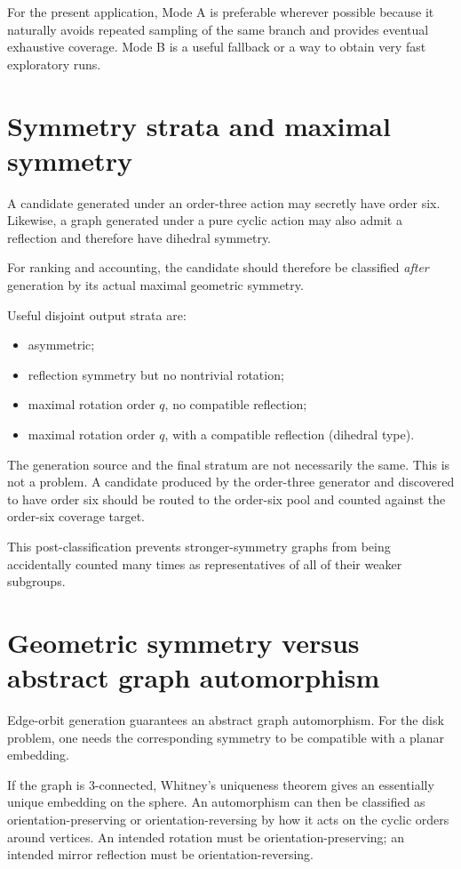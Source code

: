 \documentclass[11pt]{article}
\begin{document}
For the present application, Mode A is preferable wherever possible because it naturally avoids repeated sampling of the same branch and provides eventual exhaustive coverage. Mode B is a useful fallback or a way to obtain very fast exploratory runs.

\section{Symmetry strata and maximal symmetry}

A candidate generated under an order-three action may secretly have order six. Likewise, a graph generated under a pure cyclic action may also admit a reflection and therefore have dihedral symmetry.

For ranking and accounting, the candidate should therefore be classified \emph{after} generation by its actual maximal geometric symmetry.

Useful disjoint output strata are:
\begin{itemize}
  \item asymmetric;
  \item reflection symmetry but no nontrivial rotation;
  \item maximal rotation order \(q\), no compatible reflection;
  \item maximal rotation order \(q\), with a compatible reflection (dihedral type).
\end{itemize}

The generation source and the final stratum are not necessarily the same. This is not a problem. A candidate produced by the order-three generator and discovered to have order six should be routed to the order-six pool and counted against the order-six coverage target.

This post-classification prevents stronger-symmetry graphs from being accidentally counted many times as representatives of all of their weaker subgroups.

\section{Geometric symmetry versus abstract graph automorphism}

Edge-orbit generation guarantees an abstract graph automorphism. For the disk problem, one needs the corresponding symmetry to be compatible with a planar embedding.

If the graph is 3-connected, Whitney's uniqueness theorem gives an essentially unique embedding on the sphere. An automorphism can then be classified as orientation-preserving or orientation-reversing by how it acts on the cyclic orders around vertices. An intended rotation must be orientation-preserving; an intended mirror reflection must be orientation-reversing.
\end{document}
